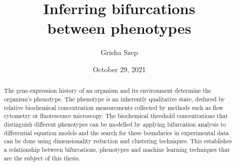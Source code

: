\title{Inferring bifurcations\\between phenotypes}
\author{Grisha Szep}


\date{October 29, 2021}
\maketitle

\begin{abstract} %

    The gene-expression history of an organism and its environment determine the organism's phenotype. The phenotype is an inherently qualitative state, deduced by relative biochemical concentration measurements collected by methods such as flow cytometry or fluorescence microscopy. The biochemical threshold concentrations that distinguish different phenotypes can be modelled by applying bifurcation analysis to differential equation models and the search for these boundaries in experimental data can be done using dimensionality reduction and clustering techniques. This establishes a relationship between bifurcations, phenotypes and machine learning techniques that are the subject of this thesis.

    
    

\end{abstract}
